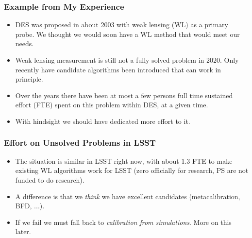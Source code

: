\documentclass{beamer}
\begin{document}
\frame
{
    \frametitle{Example from My Experience}


    \begin{itemize}

        \item DES was proposed in about 2003 with weak lensing (WL) as a primary
            probe.  We thought we would soon have a WL method that
            would meet our needs.

        \item Weak lensing measurement is still not a fully solved problem in
            2020.  Only recently have candidate algorithms been introduced that
            can work in principle.


        \item  Over the years there have been at most a few persons full time
            sustained effort (FTE) spent on this problem within DES, at a given
            time.

        \item With hindsight we should have dedicated more effort to it.


    \end{itemize}

}
\frame
{
    \frametitle{Effort on Unsolved Problems in LSST}


    \begin{itemize}

        \item The situation is similar in LSST right now, with about 1.3
            FTE to make existing WL algorithms work for LSST (zero officially for
            research, PS are not funded to do research).

        \item A difference is that we {\em think} we have excellent candidates
            (metacalibration, BFD, ...).

        \item If we fail we must fall back to {\em calibration from simulations}.  More
            on this later.

    \end{itemize}

}
\end{document}
